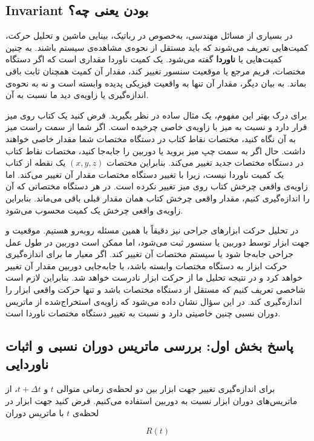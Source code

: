 \documentclass{article}
\begin{document}
\subsection{Invariant بودن یعنی چه؟}

در بسیاری از مسائل مهندسی، به‌خصوص در رباتیک، بینایی ماشین و تحلیل حرکت، کمیت‌هایی تعریف می‌شوند که باید مستقل از نحوه‌ی مشاهده‌ی سیستم باشند. به چنین کمیت‌هایی  یا \textbf{ناوردا} گفته می‌شود. یک کمیت ناوردا مقداری است که اگر دستگاه مختصات، فریم مرجع یا موقعیت سنسور تغییر کند، مقدار آن کمیت همچنان ثابت باقی بماند. به بیان دیگر، مقدار آن تنها به واقعیت فیزیکی پدیده وابسته است و نه به نحوه‌ی اندازه‌گیری یا زاویه‌ی دید ما نسبت به آن.

برای درک بهتر این مفهوم، یک مثال ساده در نظر بگیرید. فرض کنید یک کتاب روی میز قرار دارد و نسبت به میز با زاویه‌ی خاصی چرخیده است. اگر شما از سمت راست میز به آن نگاه کنید، مختصات نقاط کتاب در دستگاه مختصات شما مقدار خاصی خواهند داشت. حال اگر به سمت چپ میز بروید یا دوربین را جابه‌جا کنید، مختصات نقاط کتاب در دستگاه مختصات جدید تغییر می‌کند. بنابراین مختصات \((x,y,z)\) یک نقطه از کتاب یک کمیت ناوردا نیست، زیرا با تغییر دستگاه مختصات مقدار آن تغییر می‌کند. اما زاویه‌ی واقعی چرخش کتاب روی میز تغییر نکرده است. در هر دستگاه مختصاتی که آن را اندازه‌گیری کنیم، مقدار واقعی چرخش کتاب همان مقدار قبلی باقی می‌ماند. بنابراین زاویه‌ی واقعی چرخش یک کمیت  محسوب می‌شود.

در تحلیل حرکت ابزارهای جراحی نیز دقیقاً با همین مسئله روبه‌رو هستیم. موقعیت و جهت ابزار توسط دوربین یا سنسور ثبت می‌شود، اما ممکن است دوربین در طول عمل جراحی جابه‌جا شود یا سیستم مختصات آن تغییر کند. اگر معیار ما برای اندازه‌گیری حرکت ابزار به دستگاه مختصات وابسته باشد، با جابه‌جایی دوربین مقدار آن تغییر خواهد کرد و در نتیجه تحلیل ما از حرکت ابزار نادرست خواهد شد. بنابراین لازم است شاخصی تعریف کنیم که مستقل از دستگاه مختصات باشد و تنها حرکت واقعی ابزار را اندازه‌گیری کند. در این سؤال نشان داده می‌شود که زاویه‌ی استخراج‌شده از ماتریس دوران نسبی چنین خاصیتی دارد و نسبت به تغییر دستگاه مختصات ناوردا است.

\subsection{پاسخ بخش اول: بررسی ماتریس دوران نسبی و اثبات ناوردایی}

برای اندازه‌گیری تغییر جهت ابزار بین دو لحظه‌ی زمانی متوالی \(t\) و \(t+\Delta t\)، از ماتریس‌های دوران ابزار نسبت به دوربین استفاده می‌کنیم. فرض کنید جهت ابزار در لحظه‌ی \(t\) با ماتریس دوران

\[
R(t)
\]
\end{document}
